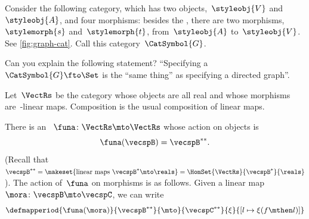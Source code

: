 {%

% 



\begin{gradedexercise}
    \label{ex:GraphsViaFunctors}
    Consider the following category, which has two objects,~$\styleobj{V}$ and~$\styleobj{A}$, and four morphisms: besides the , there are two morphisms,~$\stylemorph{s}$ and~$\stylemorph{t}$, from~$\styleobj{A}$ to~$\styleobj{V}$.
    See \cref{fig:graph-cat}.
    Call this category~$\CatSymbol{G}$.

    Can you explain the following statement?
    ``Specifying a ~$\CatSymbol{G} \fto \Set$ is the ``same thing'' as specifying a directed graph''.
\end{gradedexercise}

\begin{marginfigure}
    \centering
    \caption{}
    \label{fig:graph-cat}
\end{marginfigure}



\begin{example}
    \label{exa:double-dual-functor}
    Let~$\VectRs$ be the category whose objects are all real  and whose morphisms are~\reals-linear maps.
    Composition is the usual composition of linear maps.

    There is an ~$\funa \colon \VectRs \mto \VectRs$ whose action on objects is
    \begin{equation}
        \funa ( \vecspB ) = \vecspB^{**}.
    \end{equation}
    (Recall that~$\vecspB^{**} = \makeset{ \text{linear maps } \vecspB^* \mto \reals } =  \HomSet{\VectRs}{\vecspB^*}{\reals}$).
    The action of~$\funa$ on morphisms is as follows.
    Given a linear map~$\mora \colon \vecspB \mto \vecspC$, we can write
    \begin{equation}
        \defmapperiod{\funa ( \mora ) }{\vecspB^{**}}{\mto}{\vecspC^{**}}{\xi}{[ l \mapsto \xi (f \mthen l)]}
    \end{equation}
\end{example}



}
